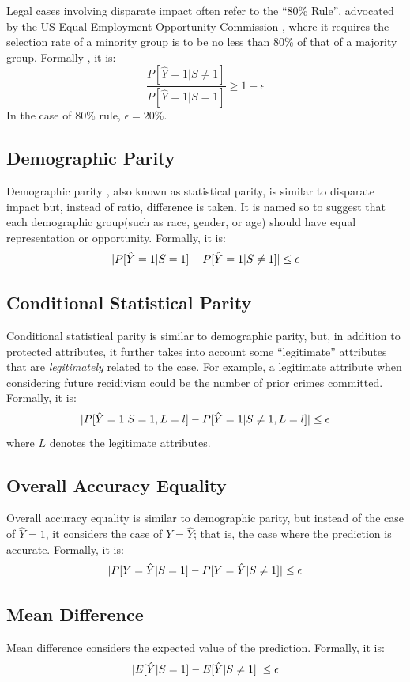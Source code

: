 \documentclass[conference]{IEEEtran}
\begin{document}
Legal cases involving disparate impact often refer to the ``80\% Rule'', advocated by the US Equal Employment Opportunity Commission \cite{eeoc1979}, where it requires the selection rate of a minority group is to be no less than 80\% of that of a majority group. Formally \cite{feldman2015certifying}, it is:
\[
    \frac{P[\hat{Y} = 1 | S \neq 1]}{P[\hat{Y} = 1 | S = 1]} \geq 1 - \epsilon
\]
In the case of 80\% rule, $\epsilon = 20\%$.

\subsection{Demographic Parity} %
Demographic parity \cite{calders2010three}, also known as statistical parity, is similar to disparate impact but, instead of ratio, difference is taken. It is named so to suggest that each demographic group(such as race, gender, or age) should have equal representation or opportunity. Formally, it is:
\[
    \lvert P[\hat{Y} = 1 | S = 1] - P[\hat{Y} = 1 | S \neq 1]\rvert \leq \epsilon
\]

\subsection{Conditional Statistical Parity}
Conditional statistical parity \cite{corbett2017algorithmic} is similar to demographic parity, but, in addition to protected attributes, it further takes into account some ``legitimate'' attributes that are \textit{legitimately} related to the case. For example, a legitimate attribute when considering future recidivism could be the number of prior crimes committed. Formally, it is:
\[
    \lvert P[\hat{Y} = 1 | S = 1, L = l] - P[\hat{Y} = 1 | S \neq 1, L = l]\rvert \leq \epsilon
\]
where $L$ denotes the legitimate attributes.

\subsection{Overall Accuracy Equality}
Overall accuracy equality \cite{berk2021fairness} is similar to demographic parity, but instead of the case of $\hat{Y} = 1$, it considers the case of $Y = \hat{Y}$; that is, the case where the prediction is accurate. Formally, it is:
\[
    \lvert P[Y = \hat{Y} | S = 1] - P[Y = \hat{Y} | S \neq 1]\rvert \leq \epsilon
\]

\subsection{Mean Difference}
Mean difference \cite{vzliobaite2017measuring} considers the expected value of the prediction. Formally, it is:
\[
    \lvert E[\hat{Y}|S = 1] - E[\hat{Y}|S \neq 1]\rvert \leq \epsilon
\]
\end{document}
